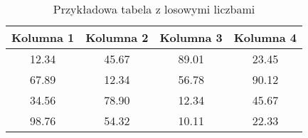 \begin{table}[h!]
    \centering
    \caption{Przykładowa tabela z losowymi liczbami}
    
    \label{tab:random_table}
    \begin{tabular}{cccc}
        \hline
        Kolumna 1 & Kolumna 2 & Kolumna 3 & Kolumna 4 \\
        \hline
        12.34 & 45.67 & 89.01 & 23.45 \\
        67.89 & 12.34 & 56.78 & 90.12 \\
        34.56 & 78.90 & 12.34 & 45.67 \\
        98.76 & 54.32 & 10.11 & 22.33 \\
        \hline
    \end{tabular}
\end{table}